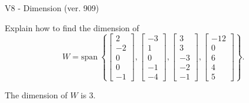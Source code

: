 \begin{exercise}
  \begin{exerciseTitle}V8 - Dimension (ver. 909)\end{exerciseTitle}
  \begin{exerciseStatement}
    Explain how to find the dimension of 
\[W=\mathrm{span}\ \left\{\left[\begin{array}{r}
2 \\
-2 \\
0 \\
0 \\
-1
\end{array}\right] , \left[\begin{array}{r}
-3 \\
1 \\
0 \\
-1 \\
-4
\end{array}\right] , \left[\begin{array}{r}
3 \\
3 \\
-3 \\
-2 \\
-1
\end{array}\right] , \left[\begin{array}{r}
-12 \\
0 \\
6 \\
4 \\
5
\end{array}\right]\right\}.\]



  \end{exerciseStatement}
  \begin{exerciseAnswer}
   The dimension of \(W\) is  \(3\).
  


  \end{exerciseAnswer}
\end{exercise}